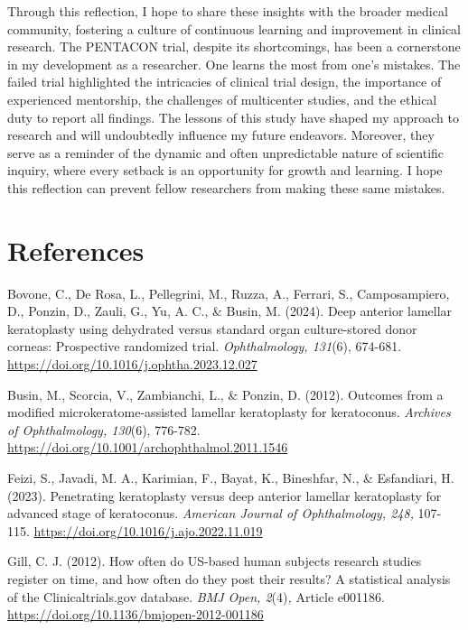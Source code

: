 \documentclass[authordate, empirical]{jote-new-article}
\begin{document}
	Through this reflection, I hope to share these insights with the broader medical community, fostering a culture of continuous learning and improvement in clinical research. The PENTACON trial, despite its shortcomings, has been a cornerstone in my development as a researcher. One learns the most from one's mistakes. The failed trial highlighted the intricacies of clinical trial design, the importance of experienced mentorship, the challenges of multicenter studies, and the ethical duty to report all findings. The lessons of this study have shaped my approach to research and will undoubtedly influence my future endeavors. Moreover, they serve as a reminder of the dynamic and often unpredictable nature of scientific inquiry, where every setback is an opportunity for growth and learning. I hope this reflection can prevent fellow researchers from making these same mistakes.



	\section{References}



	Bovone, C., De Rosa, L., Pellegrini, M., Ruzza, A., Ferrari, S., Camposampiero, D., Ponzin, D., Zauli, G., Yu, A. C., \& Busin, M. (2024). Deep anterior lamellar keratoplasty using dehydrated versus standard organ culture-stored donor corneas: Prospective randomized trial. \emph{Ophthalmology, 131}(6), 674-681. \url{https://doi.org/10.1016/j.ophtha.2023.12.027}



	Busin, M., Scorcia, V., Zambianchi, L., \& Ponzin, D. (2012). Outcomes from a modified microkeratome-assisted lamellar keratoplasty for keratoconus. \emph{Archives of Ophthalmology, 130}(6), 776-782. \url{https://doi.org/10.1001/archophthalmol.2011.1546}



	Feizi, S., Javadi, M. A., Karimian, F., Bayat, K., Bineshfar, N., \& Esfandiari, H. (2023). Penetrating keratoplasty versus deep anterior lamellar keratoplasty for advanced stage of keratoconus. \emph{American Journal of Ophthalmology, 248, }107-115. \url{https://doi.org/10.1016/j.ajo.2022.11.019}



	Gill, C. J. (2012). How often do US-based human subjects research studies register on time, and how often do they post their results? A statistical analysis of the Clinicaltrials.gov database. \emph{BMJ Open, 2}(4)\emph{, }Article e001186. \url{https://doi.org/10.1136/bmjopen-2012-001186}
\end{document}
